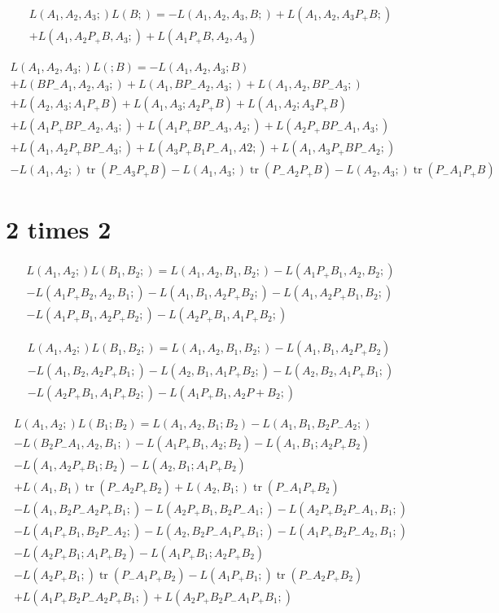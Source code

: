 \documentclass[b5paper,draft,openbib,12pt]{memoir}
\DeclareMathOperator{\tr}{tr}
\begin{document}
\begin{multline}
L(A_1,A_2,A_3;)L(B;)= -L(A_1,A_2,A_3,B;) + L(A_1,A_2,A_3P_+B;)\\
+ L(A_1,A_2P_+B,A_3;) +L(A_1P_+B,A_2,A_3)
\end{multline}

\begin{multline}
L(A_1,A_2,A_3;)L(;B) = -L(A_1,A_2,A_3;B)\\
+ L(BP_-A_1,A_2,A_3;) + L(A_1,BP_-A_2,A_3;) + L(A_1,A_2,BP_-A_3;)\\
+L(A_2,A_3;A_1P_+B) + L(A_1,A_3;A_2P_+B) +L(A_1,A_2;A_3P_+B)\\
+L(A_1P_+BP_-A_2,A_3;) + L(A_1P_+BP_-A_3,A_2;) + L(A_2P_+BP_-A_1,A_3;)\\
+L(A_1,A_2P_+BP_-A_3;) + L(A_3P_+B_1P_-A_1,A2;) + L(A_1,A_3P_+BP_-A_2;)\\
-L(A_1,A_2;)\tr(P_-A_3P_+B) - L(A_1,A_3;)\tr(P_-A_2P_+B) - L(A_2,A_3;) \tr(P_-A_1P_+B)
\end{multline}


\section{2 times 2}

\begin{multline}
L(A_1,A_2;)L(B_1,B_2;)= L(A_1,A_2,B_1,B_2;) -L(A_1P_+B_1,A_2,B_2;)\\
-L(A_1P_+B_2,A_2,B_1;) - L(A_1,B_1,A_2P_+B_2;) - L(A_1,A_2P_+B_1,B_2;)\\
-L(A_1P_+B_1,A_2P_+B_2;) - L(A_2P_+B_1,A_1P_+B_2;)
\end{multline}

\begin{multline}
L(A_1,A_2;)L(B_1,B_2;)= L(A_1,A_2,B_1,B_2;)-L(A_1,B_1,A_2P_+B_2) \\
-L(A_1,B_2,A_2P_+B_1;) - L(A_2,B_1,A_1P_+B_2;) - L(A_2,B_2, A_1P_+B_1;)\\
-L(A_2P_+B_1,A_1P_+B_2;)- L(A_1P_+B_1,A_2P+B_2;)
\end{multline}

\begin{multline}
L(A_1,A_2;)L(B_1;B_2)= L(A_1,A_2,B_1;B_2) - L(A_1,B_1,B_2P_-A_2;)\\
-L(B_2P_-A_1,A_2,B_1;)-L(A_1P_+B_1,A_2;B_2)-L(A_1,B_1;A_2P_+B_2)\\
-L(A_1,A_2P_+B_1;B_2) - L(A_2,B_1;A_1P_+B_2)\\
+L(A_1,B_1)\tr(P_-A_2P_+B_2) +L(A_2,B_1;)\tr(P_-A_1P_+B_2) \\
-L(A_1,B_2P_-A_2P_+B_1;) -L(A_2P_+B_1,B_2P_-A_1;) -L(A_2P_+B_2P_-A_1,B_1;)\\
-L(A_1P_+B_1,B_2P_-A_2;) -L(A_2,B_2P_-A_1P_+B_1;) -L(A_1P_+B_2P_-A_2,B_1;)\\
-L(A_2P_+B_1;A_1P_+B_2) - L(A_1P_+B_1;A_2P_+B_2)\\
-L(A_2P_+B_1;)\tr(P_-A_1P_+B_2) - L(A_1 P_+B_1;) \tr(P_-A_2P_+B_2)\\
+L(A_1P_+B_2P_-A_2P_+B_1;) +L(A_2P_+B_2P_-A_1P_+B_1;)
\end{multline}
\end{document}
